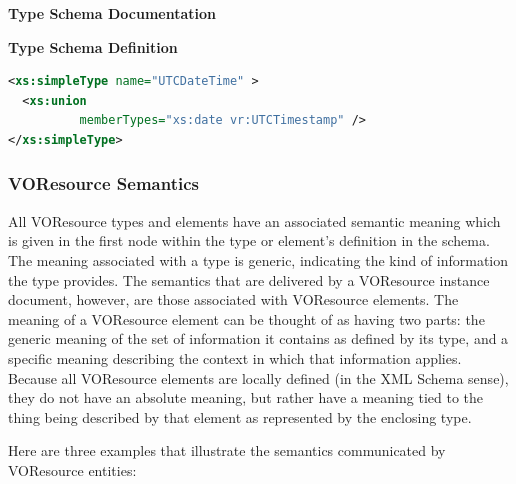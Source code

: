 \documentclass[11pt,a4paper]{ivoa}
\begin{document}
\begin{generated}
\begingroup
      	\renewcommand*\descriptionlabel[1]{%
      	\hbox to 5.5em{\emph{#1}\hfil}}\vspace{2ex}\noindent\textbf{ Type Schema Documentation}


\vspace{1ex}\noindent\textbf{ Type Schema Definition}

\begin{lstlisting}[language=XML,basicstyle=\footnotesize]
<xs:simpleType name="UTCDateTime" >
  <xs:union
          memberTypes="xs:date vr:UTCTimestamp" />
</xs:simpleType>
\end{lstlisting}\endgroup
\end{generated}


\subsubsection{VOResource Semantics}

All VOResource types and elements have an associated semantic meaning
which is given in the first 
node within the type or element's definition in the schema.  The
meaning associated with a type is generic, indicating the kind of
information the type provides.  The semantics that are delivered by a
VOResource instance document, however, are those associated with
VOResource elements.  The meaning of a VOResource element can be
thought of as having two parts:  the generic meaning of the set of
information it contains as defined by its type, and a specific meaning
describing the context in which that information applies.  Because all
VOResource elements are locally defined (in the XML Schema
sense), they do not have an absolute meaning, but rather have a
meaning tied to the thing being described by that element as
represented by the enclosing type.  

Here are three examples that illustrate the semantics communicated by
VOResource entities:
\end{document}
